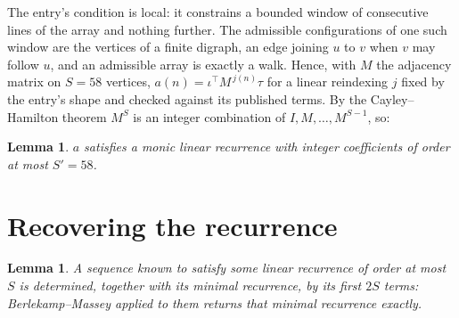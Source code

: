 \documentclass[11pt,a4paper]{article}
\theoremstyle{plain}
\newtheorem{lemma}[theorem]{Lemma}
\theoremstyle{definition}
\begin{document}
The entry's condition is local: it constrains a bounded window of consecutive lines of the
array and nothing further. The admissible configurations of one such window are the vertices
of a finite digraph, an edge joining $u$ to $v$ when $v$ may follow $u$, and an admissible
array is exactly a walk. Hence, with $M$ the adjacency matrix on $S=58$ vertices,
$a(n)=\iota^{\!\top}M^{\,j(n)}\tau$ for a linear reindexing $j$ fixed by the entry's shape
and checked against its published terms. By the Cayley--Hamilton theorem $M^{S}$ is an
integer combination of $I,M,\dots,M^{S-1}$, so:

\begin{lemma}\label{lem:cf}
$a$ satisfies a monic linear recurrence with integer coefficients of order at most
$S'=58$.
\end{lemma}

\section{Recovering the recurrence}

\begin{lemma}\label{lem:bm}
A sequence known to satisfy some linear recurrence of order at most $S$ is determined, together
with its minimal recurrence, by its first $2S$ terms: Berlekamp--Massey applied to them returns
that minimal recurrence exactly.
\end{lemma}
\end{document}
